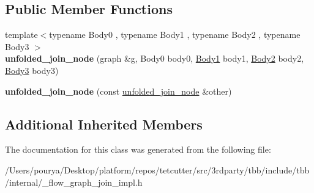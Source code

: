 \subsection*{Public Member Functions}
\begin{DoxyCompactItemize}
\item 
\hypertarget{classinternal_1_1unfolded__join__node_3_014_00_01tag__matching__port_00_01OutputTuple_00_01tag__matching_01_4_ab02b43b6b2c23ccad1887b4a407d7635}{}{\footnotesize template$<$typename Body0 , typename Body1 , typename Body2 , typename Body3 $>$ }\\{\bfseries unfolded\+\_\+join\+\_\+node} (graph \&g, Body0 body0, \hyperlink{structBody1}{Body1} body1, \hyperlink{structBody2}{Body2} body2, \hyperlink{structBody3}{Body3} body3)\label{classinternal_1_1unfolded__join__node_3_014_00_01tag__matching__port_00_01OutputTuple_00_01tag__matching_01_4_ab02b43b6b2c23ccad1887b4a407d7635}

\item 
\hypertarget{classinternal_1_1unfolded__join__node_3_014_00_01tag__matching__port_00_01OutputTuple_00_01tag__matching_01_4_a9c69add265c30190e71695adbc0a141e}{}{\bfseries unfolded\+\_\+join\+\_\+node} (const \hyperlink{classinternal_1_1unfolded__join__node}{unfolded\+\_\+join\+\_\+node} \&other)\label{classinternal_1_1unfolded__join__node_3_014_00_01tag__matching__port_00_01OutputTuple_00_01tag__matching_01_4_a9c69add265c30190e71695adbc0a141e}

\end{DoxyCompactItemize}
\subsection*{Additional Inherited Members}


The documentation for this class was generated from the following file\+:\begin{DoxyCompactItemize}
\item 
/\+Users/pourya/\+Desktop/platform/repos/tetcutter/src/3rdparty/tbb/include/tbb/internal/\+\_\+flow\+\_\+graph\+\_\+join\+\_\+impl.\+h\end{DoxyCompactItemize}
